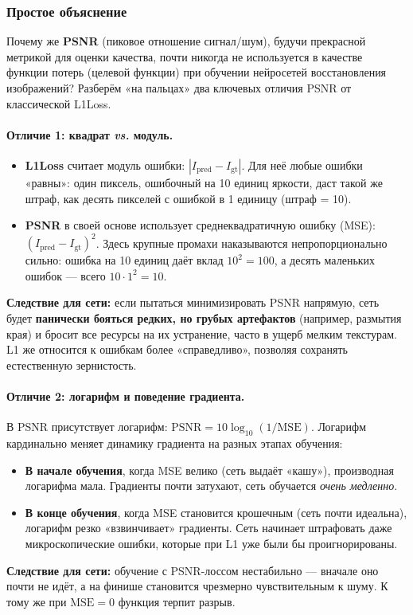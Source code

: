 \documentclass[12pt,a4paper]{article}
\begin{document}
\subsubsection{Простое объяснение}

Почему же \textbf{PSNR} (пиковое отношение сигнал/шум), будучи прекрасной метрикой для оценки качества, почти никогда не используется в качестве функции потерь (целевой функции) при обучении нейросетей восстановления изображений? Разберём «на пальцах» два ключевых отличия PSNR от классической L1Loss.

\paragraph{Отличие 1: квадрат \textit{vs.} модуль.}
\begin{itemize}
    \item \textbf{L1Loss} считает модуль ошибки: \(|I_{\text{pred}} - I_{\text{gt}}|\). Для неё любые ошибки «равны»: один пиксель, ошибочный на 10 единиц яркости, даст такой же штраф, как десять пикселей с ошибкой в 1 единицу (штраф = 10).
    \item \textbf{PSNR} в своей основе использует среднеквадратичную ошибку (MSE): \((I_{\text{pred}} - I_{\text{gt}})^2\). Здесь крупные промахи наказываются непропорционально сильно: ошибка на 10 единиц даёт вклад \(10^2 = 100\), а десять маленьких ошибок — всего \(10\cdot1^2 = 10\).
\end{itemize}
\textbf{Следствие для сети:} если пытаться минимизировать PSNR напрямую, сеть будет \textbf{панически бояться редких, но грубых артефактов} (например, размытия края) и бросит все ресурсы на их устранение, часто в ущерб мелким текстурам. L1 же относится к ошибкам более «справедливо», позволяя сохранять естественную зернистость.

\paragraph{Отличие 2: логарифм и поведение градиента.}
В PSNR присутствует логарифм: \(\text{PSNR}=10\log_{10}(1/\text{MSE})\). Логарифм кардинально меняет динамику градиента на разных этапах обучения:
\begin{itemize}
    \item \textbf{В начале обучения}, когда MSE велико (сеть выдаёт «кашу»), производная логарифма мала. Градиенты почти затухают, сеть обучается \textit{очень медленно}.
    \item \textbf{В конце обучения}, когда MSE становится крошечным (сеть почти идеальна), логарифм резко «взвинчивает» градиенты. Сеть начинает штрафовать даже микроскопические ошибки, которые при L1 уже были бы проигнорированы.
\end{itemize}
\textbf{Следствие для сети:} обучение с PSNR-лоссом нестабильно — вначале оно почти не идёт, а на финише становится чрезмерно чувствительным к шуму. К тому же при \(\text{MSE}=0\) функция терпит разрыв.
\end{document}
